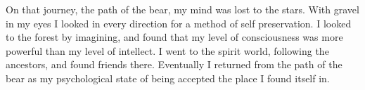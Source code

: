 

﻿On that journey, the path of the bear, my mind was lost to the stars.  With gravel in my eyes I looked in every direction for a method of self preservation.  I looked to the forest by imagining, and found that my level of consciousness was more powerful than my level of intellect.  I went to the spirit world, following the ancestors, and found friends there.  Eventually I returned from the path of the bear as my psychological state of being accepted the place I found itself in.
\bye
